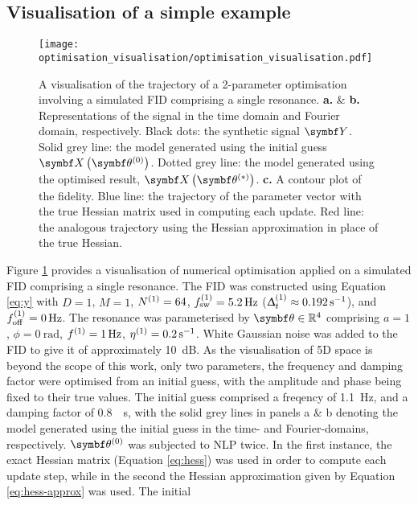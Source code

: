 \subsection{Visualisation of a simple example}
\label{subsec:optim-vis}
\begin{figure}
    \centering
    \texttt{[image: optimisation\_visualisation/optimisation\_visualisation.pdf]}
    \caption{
        A visualisation of the trajectory of a 2-parameter optimisation
        involving a simulated \acs{FID} comprising a single resonance.
        \textbf{a.} \& \textbf{b.} Representations of the signal in
        the time domain and Fourier domain, respectively.
        Black dots: the synthetic signal $\bY$.
        Solid grey line: the model generated
        using the initial guess $\bX \left( \bthzero \right)$.
        Dotted grey line: the model generated using the optimised result, $\bX
        \left( \bthstar \right)$.
        \textbf{c.} A contour plot of the fidelity.
        Blue line: the trajectory of the parameter vector with the true
        Hessian matrix used in computing each update.
        Red line: the analogous trajectory using the Hessian approximation
        in place of the true Hessian.
    }
    \label{fig:optim-vis}
\end{figure}
Figure \ref{fig:optim-vis} provides a visualisation of numerical optimisation
applied on a simulated \ac{FID} comprising a single resonance.
The FID was constructed using Equation \ref{eq:y} with $D=1$, $M=1$, $N^{(1)} =
64$, $f_{\mathrm{sw}}^{(1)} = \qty{5.2}{\hertz}$ ($\Updelta_t^{(1)} \approx \qty{0.192}{\per\second}$),
and $f_{\mathrm{off}}^{(1)} = \qty{0}{\hertz}$.
The resonance was parameterised by $\bth \in \mathbb{R}^4$ comprising $a=1$,
$\phi=\qty{0}{\radian}$, $f^{(1)}=\qty{1}{\hertz}$, $\eta^{(1)}=\qty{0.2}{\per\second}$.
White Gaussian noise was added to the FID to give it  of approximately
\qty{10}{\deci\bel}. As the visualisation of 5D space is beyond the scope of
this work, only two parameters, the frequency and damping factor were optimised
from an initial guess, with the amplitude and phase being fixed to their true
values. The initial guess comprised a freqency of \qty{1.1}{\hertz}, and a
damping factor of \qty{0.8}{\per\second}, with the solid grey lines in panels a
\& b denoting the model generated using the initial guess in the time- and
Fourier-domains, respectively. $\bthzero$ was subjected to \ac{NLP} twice. In
the first instance, the exact Hessian matrix (Equation \ref{eq:hess}) was used
in order to compute each update step, while in the second the Hessian
approximation given by Equation \ref{eq:hess-approx} was used. The initial
